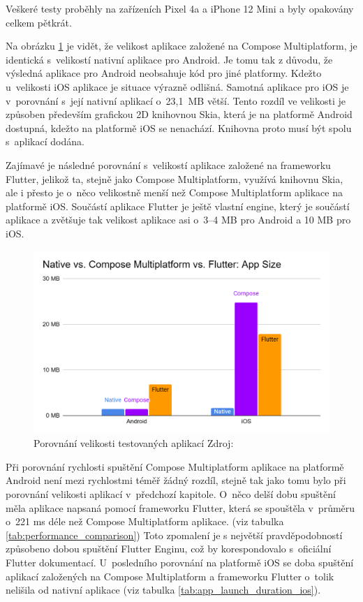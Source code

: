 Veškeré testy proběhly na zařízeních Pixel 4a a iPhone 12 Mini a byly opakovány celkem pětkrát.





Na obrázku \ref{fig:chart_app_sizes} je vidět, že velikost aplikace založené na Compose Multiplatform, je identická
s~velikostí nativní aplikace pro Android. Je tomu tak z důvodu, že výsledná aplikace pro Android neobsahuje kód 
pro jiné platformy. \cite{imgAndroidFlutterCompose} Kdežto u~velikosti iOS aplikace je situace výrazně odlišná. Samotná aplikace pro iOS je v~porovnání
s~její nativní aplikací o~23,1~MB větší. Tento rozdíl ve velikosti je způsoben především grafickou 2D knihovnou Skia,
která je na platformě Android dostupná, kdežto na platformě iOS se nenachází. Knihovna proto musí být spolu s~aplikací dodána. \cite{imgAndroidFlutterCompose}

Zajímavé je následné porovnání s~velikostí aplikace založené na frameworku Flutter, jelikož ta, stejně jako Compose
Multiplatform, využívá knihovnu Skia, ale i přesto je o~něco velikostně menší než Compose Multiplatform aplikace na platformě iOS.
Součástí aplikace Flutter je ještě vlastní engine, který je součástí aplikace a zvětšuje tak velikost aplikace asi o~3–4 MB pro Android a 10 MB 
pro iOS. \cite{flutterSize}

\begin{figure}[H]
  \centering
  \includegraphics[width=.7\textwidth]{chart_app_sizes.png}
  \caption{Porovnání velikosti testovaných aplikací Zdroj: \cite{imgAndroidFlutterCompose}}
  \label{fig:chart_app_sizes}
\end{figure}


Při porovnání rychlosti spuštění Compose Multiplatform aplikace na platformě Android není mezi rychlostmi téměř žádný
rozdíl, stejně tak jako tomu bylo při porovnání velikosti aplikací v~předchozí kapitole. O~něco delší dobu spuštění měla
aplikace napsaná pomocí frameworku Flutter, která se spouštěla v~průměru o~221 ms déle než Compose Multiplatform aplikace. (viz tabulka \ref{tab:performance_comparison})
Toto zpomalení je s největší pravděpodobností způsobeno dobou spuštění Flutter Enginu, což by korespondovalo s~oficiální
Flutter dokumentací. \cite{flutterPerformance}
U~posledního porovnání na platformě iOS se doba spuštění aplikací založených na Compose Multiplatform a frameworku 
Flutter o~tolik nelišila od nativní aplikace (viz tabulka \ref{tab:app_launch_duration_ios}).

